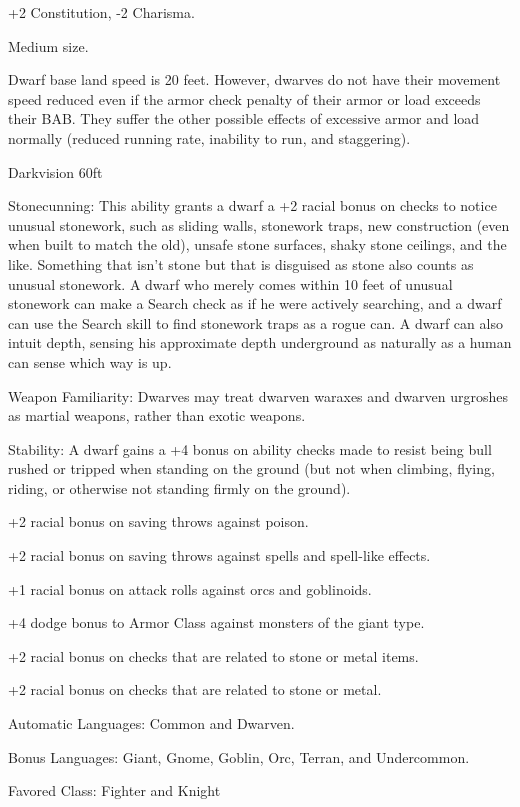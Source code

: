 

\begin{itemize*}
\item +2 Constitution, -2 Charisma.
\item Medium size.
\item Dwarf base land speed is 20 feet. However, dwarves do not have their movement speed reduced even if the armor check penalty of their armor or load exceeds their BAB. They suffer the other possible effects of excessive armor and load normally (reduced running rate, inability to run, and staggering).
\item Darkvision 60ft
\item Stonecunning: This ability grants a dwarf a +2 racial bonus on  checks to notice unusual stonework, such as sliding walls, stonework traps, new construction (even when built to match the old), unsafe stone surfaces, shaky stone ceilings, and the like. Something that isn't stone but that is disguised as stone also counts as unusual stonework. A dwarf who merely comes within 10 feet of unusual stonework can make a Search check as if he were actively searching, and a dwarf can use the Search skill to find stonework traps as a rogue can. A dwarf can also intuit depth, sensing his approximate depth underground as naturally as a human can sense which way is up.
\item Weapon Familiarity: Dwarves may treat dwarven waraxes and dwarven urgroshes as martial weapons, rather than exotic weapons.
\item Stability: A dwarf gains a +4 bonus on ability checks made to resist being bull rushed or tripped when standing on the ground (but not when climbing, flying, riding, or otherwise not standing firmly on the ground).
\item +2 racial bonus on saving throws against poison.
\item +2 racial bonus on saving throws against spells and spell-like effects.
\item +1 racial bonus on attack rolls against orcs and goblinoids.
\item +4 dodge bonus to Armor Class against monsters of the giant type.
\item +2 racial bonus on  checks that are related to stone or metal items.
\item +2 racial bonus on  checks that are related to stone or metal.
\item Automatic Languages: Common and Dwarven.
\item Bonus Languages: Giant, Gnome, Goblin, Orc, Terran, and Undercommon.
\item Favored Class: Fighter and Knight
\end{itemize*}

